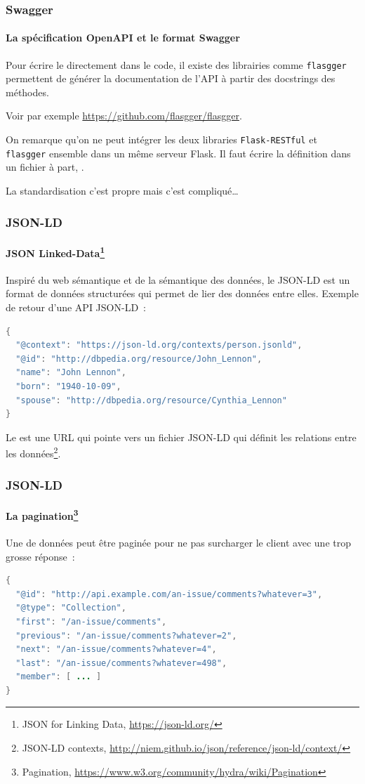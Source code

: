 \documentclass{beamer}
\begin{document}
    \begin{frame}[fragile]
        \transdissolve
        \frametitle{Swagger}
        \framesubtitle{La spécification OpenAPI et le format Swagger}
        Pour écrire le  directement dans le code, il existe des librairies comme \lstinline{flasgger} permettent de générer la documentation de l'API à partir des docstrings des méthodes.

        Voir par exemple \url{https://github.com/flasgger/flasgger}.
        \begin{dangercolorbox}
            On remarque qu'on ne peut intégrer les deux libraries \lstinline{Flask-RESTful} et \lstinline{flasgger} ensemble dans un même serveur Flask.
            Il faut écrire la définition dans un fichier  à part, .

            La standardisation c'est propre mais c'est compliqué\ldots
        \end{dangercolorbox}
    \end{frame}

    \begin{frame}[fragile]
        \transdissolve
        \frametitle{JSON-LD}
        \framesubtitle{JSON Linked-Data\footnote{JSON for Linking Data, \url{https://json-ld.org/}}}
        Inspiré du web sémantique et de la sémantique des données, le JSON-LD est un format de données structurées qui permet de lier des données entre elles.
        \bigbreak
        \bigbreak
        Exemple de retour d'une API JSON-LD~:
        \begin{lstlisting}[language=java]
{
  "@context": "https://json-ld.org/contexts/person.jsonld",
  "@id": "http://dbpedia.org/resource/John_Lennon",
  "name": "John Lennon",
  "born": "1940-10-09",
  "spouse": "http://dbpedia.org/resource/Cynthia_Lennon"
}
        \end{lstlisting}
        Le  est une URL qui pointe vers un fichier JSON-LD qui définit les relations entre les données\footnote{JSON-LD contexts, \url{http://niem.github.io/json/reference/json-ld/context/}}.
    \end{frame}

    \begin{frame}[fragile]
        \transdissolve
        \frametitle{JSON-LD}
        \framesubtitle{La pagination\footnote{Pagination, \url{https://www.w3.org/community/hydra/wiki/Pagination}}}
        Une  de données peut être paginée pour ne pas surcharger le client avec une trop grosse réponse~:
        \begin{lstlisting}[language=java]
{
  "@id": "http://api.example.com/an-issue/comments?whatever=3",
  "@type": "Collection",
  "first": "/an-issue/comments",
  "previous": "/an-issue/comments?whatever=2",
  "next": "/an-issue/comments?whatever=4",
  "last": "/an-issue/comments?whatever=498",
  "member": [ ... ]
}
        \end{lstlisting}
    \end{frame}
\end{document}

